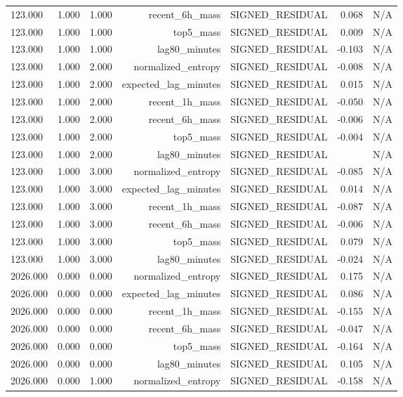 \begin{table}[h!]
\begin{tabular}{lrrrrrr}
123.000 & 1.000 & 1.000 & recent\_6h\_mass & SIGNED\_RESIDUAL & 0.068 & N/A \\
123.000 & 1.000 & 1.000 & top5\_mass & SIGNED\_RESIDUAL & 0.009 & N/A \\
123.000 & 1.000 & 1.000 & lag80\_minutes & SIGNED\_RESIDUAL & -0.103 & N/A \\
123.000 & 1.000 & 2.000 & normalized\_entropy & SIGNED\_RESIDUAL & -0.008 & N/A \\
123.000 & 1.000 & 2.000 & expected\_lag\_minutes & SIGNED\_RESIDUAL & 0.015 & N/A \\
123.000 & 1.000 & 2.000 & recent\_1h\_mass & SIGNED\_RESIDUAL & -0.050 & N/A \\
123.000 & 1.000 & 2.000 & recent\_6h\_mass & SIGNED\_RESIDUAL & -0.006 & N/A \\
123.000 & 1.000 & 2.000 & top5\_mass & SIGNED\_RESIDUAL & -0.004 & N/A \\
123.000 & 1.000 & 2.000 & lag80\_minutes & SIGNED\_RESIDUAL &  & N/A \\
123.000 & 1.000 & 3.000 & normalized\_entropy & SIGNED\_RESIDUAL & -0.085 & N/A \\
123.000 & 1.000 & 3.000 & expected\_lag\_minutes & SIGNED\_RESIDUAL & 0.014 & N/A \\
123.000 & 1.000 & 3.000 & recent\_1h\_mass & SIGNED\_RESIDUAL & -0.087 & N/A \\
123.000 & 1.000 & 3.000 & recent\_6h\_mass & SIGNED\_RESIDUAL & -0.006 & N/A \\
123.000 & 1.000 & 3.000 & top5\_mass & SIGNED\_RESIDUAL & 0.079 & N/A \\
123.000 & 1.000 & 3.000 & lag80\_minutes & SIGNED\_RESIDUAL & -0.024 & N/A \\
2026.000 & 0.000 & 0.000 & normalized\_entropy & SIGNED\_RESIDUAL & 0.175 & N/A \\
2026.000 & 0.000 & 0.000 & expected\_lag\_minutes & SIGNED\_RESIDUAL & 0.086 & N/A \\
2026.000 & 0.000 & 0.000 & recent\_1h\_mass & SIGNED\_RESIDUAL & -0.155 & N/A \\
2026.000 & 0.000 & 0.000 & recent\_6h\_mass & SIGNED\_RESIDUAL & -0.047 & N/A \\
2026.000 & 0.000 & 0.000 & top5\_mass & SIGNED\_RESIDUAL & -0.164 & N/A \\
2026.000 & 0.000 & 0.000 & lag80\_minutes & SIGNED\_RESIDUAL & 0.105 & N/A \\
2026.000 & 0.000 & 1.000 & normalized\_entropy & SIGNED\_RESIDUAL & -0.158 & N/A \\

\end{tabular}
\end{table}
